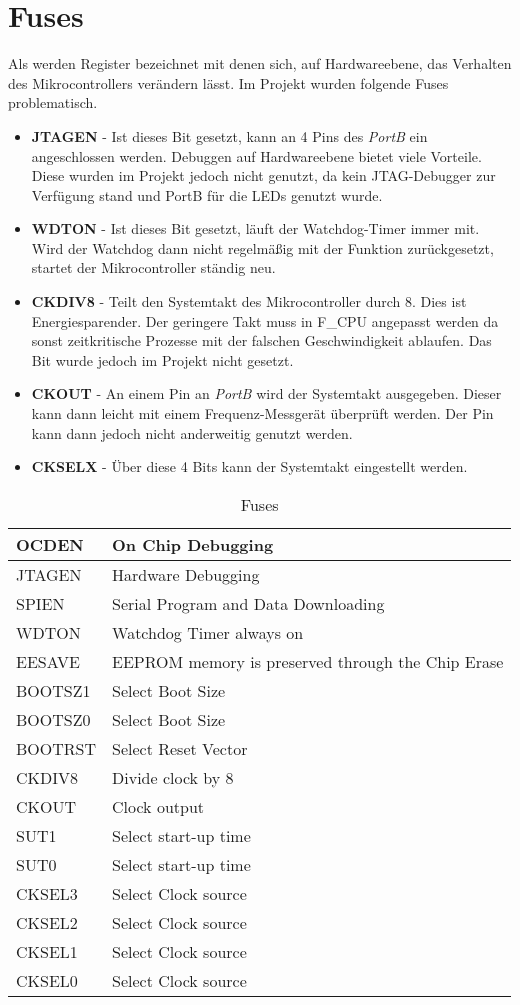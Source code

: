 \section{Fuses}
\label{sec:Fuses}
Als  werden Register bezeichnet mit denen sich, auf Hardwareebene, das Verhalten des Mikrocontrollers verändern lässt. Im Projekt wurden folgende Fuses problematisch.
\begin{itemize}
\item \textbf{JTAGEN} - Ist dieses Bit gesetzt, kann an 4 Pins des \emph{PortB} ein  angeschlossen werden. Debuggen auf Hardwareebene bietet viele Vorteile. Diese wurden im Projekt jedoch nicht genutzt, da kein JTAG-Debugger zur Verfügung stand und PortB für die LEDs genutzt wurde.
\item \textbf{WDTON} - Ist dieses Bit gesetzt, läuft der Watchdog-Timer immer mit. Wird der Watchdog dann nicht regelmäßig mit der Funktion  zurückgesetzt, startet der Mikrocontroller ständig neu. 
\item \textbf{CKDIV8} - Teilt den Systemtakt des Mikrocontroller durch 8. Dies ist Energiesparender. Der geringere Takt muss in F\_CPU angepasst werden da sonst zeitkritische Prozesse mit der falschen Geschwindigkeit ablaufen. Das Bit wurde jedoch im Projekt nicht gesetzt.
\item \textbf{CKOUT} - An einem Pin an \emph{PortB} wird der Systemtakt ausgegeben. Dieser kann dann leicht mit einem Frequenz-Messgerät überprüft werden. Der Pin kann dann jedoch nicht anderweitig genutzt werden.
\item \textbf{CKSELX} - Über diese 4 Bits kann der Systemtakt eingestellt werden.
\end{itemize}
\begin{longtable}{|l|l|} 
\caption{Fuses}\\
\hline
\label{tab:Fuses}OCDEN & On Chip Debugging\\ \hline 
JTAGEN & Hardware Debugging\\ \hline 
SPIEN & Serial Program and Data Downloading\\ \hline 
WDTON & Watchdog Timer always on\\ \hline 
EESAVE & EEPROM memory is preserved through the Chip Erase\\ \hline 
BOOTSZ1 & Select Boot Size\\ \hline 
BOOTSZ0 & Select Boot Size\\ \hline 
BOOTRST & Select Reset Vector\\ \hline 
CKDIV8 & Divide clock by 8\\ \hline 
CKOUT & Clock output\\ \hline 
SUT1 & Select start-up time\\ \hline 
SUT0 & Select start-up time\\ \hline 
CKSEL3 & Select Clock source\\ \hline 
CKSEL2 & Select Clock source\\ \hline 
CKSEL1 & Select Clock source\\ \hline 
CKSEL0 & Select Clock source\\ \hline 
\end{longtable} 
